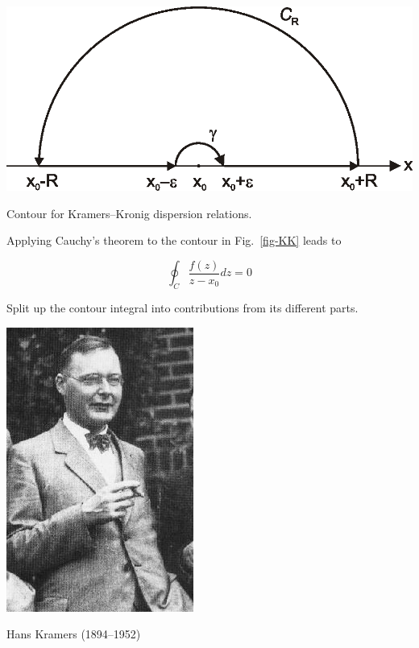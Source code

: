 \begin{marginfigure}[-0.5cm]
\centering
\includegraphics{complex/figures/kk}
\caption{Contour for Kramers--Kronig dispersion relations.}
\label{fig-KK}
\end{marginfigure}

Applying Cauchy's theorem to the contour in Fig.~\ref{fig-KK} leads to

\begin{equation}
\oint_{{C}} \frac{f(z)}{z-x_0} dz = 0
\end{equation}

\begin{cue}
Split up the contour integral into contributions from its different parts.
\end{cue}

\begin{marginfigure}[1.0cm]
  \includegraphics[]{complex/figures/h_kramers}
  \caption{Hans Kramers (1894–1952)}
\end{marginfigure}


